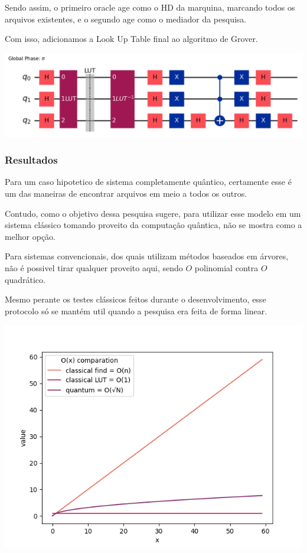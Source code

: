 \documentclass{article}
\begin{document}
Sendo assim, o primeiro oracle age como o HD da marquina, marcando todos os arquivos existentes, e o segundo age como o mediador da pesquisa.

Com isso, adicionamos a Look Up Table final ao algoritmo de Grover.

\begin{center}
	\includegraphics[scale=0.5]{file_explorer.png}
	\label{fig:file-explorer}
\end{center}

\subsubsection{Resultados}

Para um caso hipotetico de sistema completamente quântico, certamente esse é um das maneiras de encontrar arquivos em meio a todos os outros.

Contudo, como o objetivo dessa pesquisa sugere, para utilizar esse modelo em um sistema clássico tomando proveito da computação quântica, não se mostra como a melhor opção.

Para sistemas convencionais, dos quais utilizam métodos baseados em árvores, não é possivel tirar qualquer proveito aqui, sendo $O$ polinomial contra $O$ quadrático.

Mesmo perante os testes clássicos feitos durante o desenvolvimento, esse protocolo só se mantém util quando a pesquisa era feita de forma linear.


\begin{center}
	\includegraphics[scale=0.5]{algorithms-finding-comparation.png}
	\label{fig:file-explorer-comparation-O}
\end{center}
\end{document}
